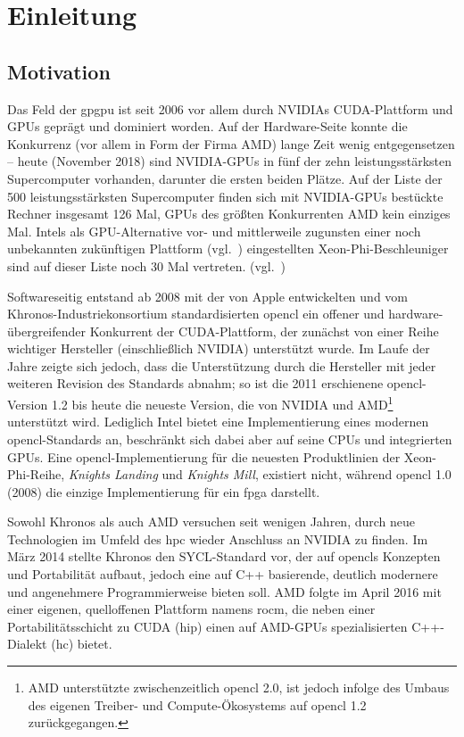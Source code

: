 \section{Einleitung}
\label{einleitung}

\subsection{Motivation}
\label{einleitung:motivation}

Das Feld der \gls{gpgpu} ist seit 2006 vor allem durch NVIDIAs CUDA-Plattform
und GPUs geprägt und dominiert worden. Auf der Hardware-Seite konnte die
Konkurrenz (vor allem in Form der Firma AMD) lange Zeit wenig
entgegensetzen -- heute (November 2018) sind NVIDIA-GPUs in fünf der zehn
leistungsstärksten Supercomputer vorhanden, darunter die ersten beiden Plätze.
Auf der Liste der 500 leistungsstärksten Supercomputer finden sich mit
NVIDIA-GPUs bestückte Rechner insgesamt 126 Mal, GPUs des größten
Konkurrenten AMD kein einziges Mal. Intels als GPU-Alternative vor- und
mittlerweile zugunsten einer noch unbekannten zukünftigen Plattform
(vgl.~\cite{intel2017}) eingestellten Xeon-Phi-Beschleuniger sind auf dieser
Liste noch 30 Mal vertreten. (vgl.~\cite{top500})

Softwareseitig entstand ab 2008 mit der von Apple entwickelten und vom
Khronos-Industriekonsortium standardisierten \gls{opencl} ein offener und
hardware-übergreifender Konkurrent der CUDA-Plattform, der zunächst von einer
Reihe wichtiger Hersteller (einschließlich NVIDIA) unterstützt wurde. Im Laufe
der Jahre zeigte sich jedoch, dass die Unterstützung durch die Hersteller mit
jeder weiteren Revision des Standards abnahm; so ist die 2011 erschienene
\gls{opencl}-Version 1.2 bis heute die neueste Version, die von NVIDIA und
AMD\footnote{AMD unterstützte zwischenzeitlich \gls{opencl} 2.0, ist jedoch
infolge des Umbaus des eigenen Treiber- und Compute-Ökosystems auf \gls{opencl}
1.2 zurückgegangen.} unterstützt wird. Lediglich Intel bietet eine
Implementierung eines modernen \gls{opencl}-Standards an, beschränkt sich dabei
aber auf seine CPUs und integrierten GPUs. Eine \gls{opencl}-Implementierung für
die neuesten Produktlinien der Xeon-Phi-Reihe, \textit{Knights Landing} und
\textit{Knights Mill}, existiert nicht, während \gls{opencl} 1.0 (2008) die
einzige Implementierung für ein \gls{fpga} darstellt.

Sowohl Khronos als auch AMD versuchen seit wenigen Jahren, durch neue
Technologien im Umfeld des \gls{hpc} wieder Anschluss an NVIDIA zu finden. Im
März 2014 stellte Khronos den SYCL-Standard vor, der auf \gls{opencl}s Konzepten
und Portabilität aufbaut, jedoch eine auf C++ basierende, deutlich modernere
und angenehmere Programmierweise bieten soll. AMD folgte im April 2016 mit einer
eigenen, quelloffenen Plattform namens \gls{rocm}, die neben einer
Portabilitätsschicht zu CUDA (\gls{hip}) einen auf AMD-GPUs spezialisierten
C++-Dialekt (\gls{hc}) bietet.

